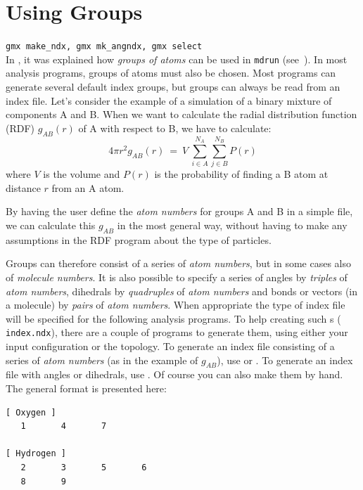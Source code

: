 \section{Using Groups}
\label{sec:usinggroups}
{\tt gmx make_ndx, gmx mk_angndx, gmx select}\\
In , it was explained how {\em groups of
atoms} can be used in {\tt mdrun} (see~).
In most analysis programs, groups
of atoms must also be chosen. Most programs can generate several default
index groups, but groups can always be read from an index file. Let's
consider the example of a simulation of a binary mixture of components A and B. When
we want to calculate the radial distribution function (RDF)
$g_{AB}(r)$ of A with respect to B, we have to calculate:
\begin{equation}
4\pi r^2 g_{AB}(r)      ~=~     V~\sum_{i \in A}^{N_A} \sum_{j \in B}^{N_B} P(r)
\end{equation}
where $V$ is the volume and $P(r)$ is the probability of finding a B atom
at distance $r$ from an A atom.

By having the user define the {\em atom numbers} for groups A and B in
a simple file, we can calculate this $g_{AB}$ in the most general way, without
having to make any assumptions in the RDF program about the type of 
particles. 

Groups can therefore consist of a series of {\em atom numbers}, but in
some cases also of {\em molecule numbers}.  It is also possible to
specify a series of angles by {\em triples} of {\em atom numbers},
dihedrals by {\em quadruples} of {\em atom numbers} and bonds or
vectors (in a molecule) by {\em pairs} of {\em atom numbers}. When
appropriate the type of index file will be specified for the following
analysis programs.  To help creating such s ({\tt
index.ndx}), there are a couple of programs to generate them, using
either your input configuration or the topology.  To generate an
index file consisting of a series of {\em atom numbers} (as in the
example of $g_{AB}$), use {\tt {}} or
{\tt {}}.  To generate an index file
with angles or dihedrals, use {\tt {}}.
Of course you can also
make them by hand. The general format is presented here:

\begin{verbatim}
[ Oxygen ]
   1       4       7

[ Hydrogen ]
   2       3       5       6
   8       9
\end{verbatim}

